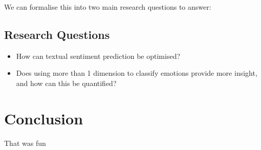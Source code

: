 \documentclass{article}
\begin{document}
We can formalise this into two main research questions to answer:

\subsection{Research Questions}
\begin{itemize}
    \item How can textual sentiment prediction be optimised?
    \item Does using more than 1 dimension to classify emotions provide more insight, and how can this be quantified?
\end{itemize}



\section{Conclusion}
That was fun

\pagebreak






\end{document}
